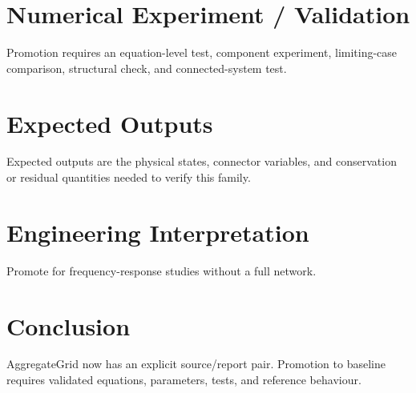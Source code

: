 \documentclass[10pt,a4paper]{article}
\begin{document}
\section{Numerical Experiment / Validation}Promotion requires an equation-level test, component experiment, limiting-case comparison, structural check, and connected-system test.
\section{Expected Outputs}Expected outputs are the physical states, connector variables, and conservation or residual quantities needed to verify this family.
\section{Engineering Interpretation}Promote for frequency-response studies without a full network.
\section*{Conclusion}AggregateGrid now has an explicit source/report pair. Promotion to baseline requires validated equations, parameters, tests, and reference behaviour.
\end{document}
